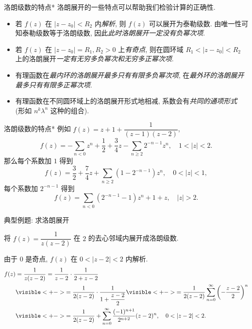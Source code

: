 \begin{frame}{洛朗级数的特点*}
\onslide<+->
洛朗展开的一些特点可以帮助我们检验计算的正确性.
\begin{itemize}
  \item  若 $f(z)$ 在 $|z-z_0|<R_2$ 内\emph{解析},
  \onslide<+->
  则 $f(z)$ 可以展开为泰勒级数.
  \onslide<+->
  由唯一性可知泰勒级数等于洛朗级数,
  \onslide<+->
  因此\emph{此时洛朗展开一定没有负幂次项}.
  \item 若 $f(z)$ 在 $|z-z_0|=R_1,R_2>0$ 上\emph{有奇点}, 则在圆环域 $R_1<|z-z_0|<R_2$ 上的洛朗展开\emph{一定有无穷多负幂次和无穷多正幂次项}.
  \item 有理函数在\emph{最内环的洛朗展开最多只有有限多负幂次项}, 在\emph{最外环的洛朗展开最多只有有限多正幂次项}.
  \item 有理函数在不同圆环域上的洛朗展开形式地相减, 系数会有\emph{共同的通项形式} (形如 $n^k\lambda^n$ 这种的组合).
\end{itemize}
\end{frame}


\begin{frame}{洛朗级数的特点*}
\onslide<+->
例如 $f(z)=z+1+\dfrac1{(z-1)(z-2)}$,
\[f(z)=-\sum_{n<0}z^n+\frac12+\frac34z-\sum_{n\ge 2}2^{-n-1}z^n,\quad 1<|z|<2.\]
\onslide<+->
那么每个系数加 $1$ 得到
\[f(z)=\frac32+\frac74z+\sum_{n\ge 2}(1-2^{-n-1})z^n,\quad 0<|z|<1,\]
\onslide<+->
每个系数加 $2^{-n-1}$ 得到
\[f(z)=\sum_{n<0}(2^{-n-1}-1)z^n+1+z,\quad |z|>2.\]
\end{frame}


\begin{frame}{典型例题: 求洛朗展开}
\begin{example}
将 $f(z)=\dfrac1{z(z-2)}$ 在 $2$ 的去心邻域内展开成洛朗级数.
\end{example}
\begin{solution}
由于 $0$ 是奇点, $f(z)$ 在 $0<|z-2|<2$ 内解析.
\onslide<+->
\begin{align*}
f(z)&=\frac1{z(z-2)}=\frac1{z-2}\cdot\frac1{2+z-2}\\
&\visible<+->{=\frac1{2(z-2)}\cdot\frac1{1+\dfrac{z-2}2}}
	\visible<+->{=\frac1{2(z-2)}\sum_{n=0}^\infty\left(-\frac{z-2}2\right)^n}\\
&\visible<+->{=\frac1{2(z-2)}+\sum_{n=0}^\infty\frac{(-1)^{n+1}}{2^{n+2}}(z-2)^n,\quad 0<|z-2|<2.}
\end{align*}
\vspace{-0.7\baselineskip}
\end{solution}
\end{frame}



